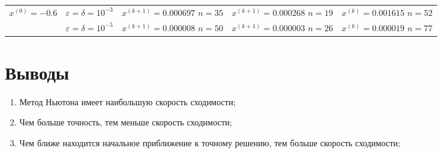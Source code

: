\begin{table}[h!]
\begin{tabular}{|p{12ex}|l|p{20ex}|p{20ex}|p{20ex}|}
		\(x^{(0)} = -0.6\)                       &                                                                                                               %
		\(\varepsilon = \delta = 10^{-3} \)      &                                                                                                               %
		\(x^{(k+1)}=0.000697\) \newline \(n=35\) &                                                                                                               %
		\(x^{(k+1)}=0.000268\) \newline \(n=19\) &                                                                                                               %
		\(x^{(k)}=0.001615\) \newline \(n=52\)                                                                                                                   \\ \cline{2-5}
		                                         & \(\varepsilon = \delta = 10^{-5} \) &                                                                         %
		\(x^{(k+1)}=0.000008\) \newline \(n=50\) &                                                                                                               %
		\(x^{(k+1)}=0.000003\) \newline \(n=26\) &                                                                                                               %
		\(x^{(k)}=0.000019\) \newline \(n=77\)                                                                                                                   \\ \hline
	\end{tabular}
\end{table}

\section{Выводы}
\begin{enumerate}
	\item Метод Ньютона имеет наибольшую скорость сходимости;
	\item Чем больше точность, тем меньше скорость сходимости;
	\item Чем ближе находится начальное приближение к точному решению, тем больше скорость сходимости;
\end{enumerate}
